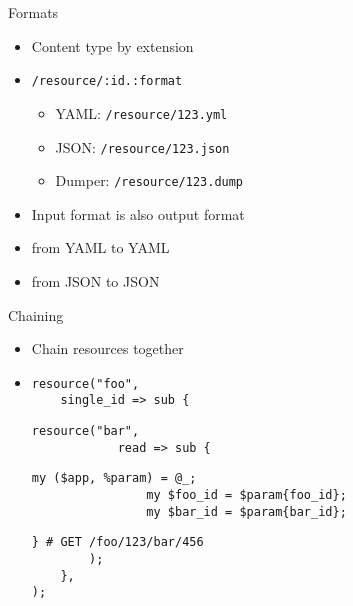 \begin{frame}{Formats}
    \pause
    \begin{itemize}
        \item Content type by extension
        \pause
        \item \texttt{/resource/:id.:format}
        \pause
        \begin{itemize}
            \item YAML: \texttt{/resource/123.yml}
            \pause
            \item JSON: \texttt{/resource/123.json}
            \pause
            \item Dumper: \texttt{/resource/123.dump}
            \pause
        \end{itemize}
        \item Input format is also output format
        \pause
        \item from YAML to YAML
        \pause
        \item from JSON to JSON
    \end{itemize}

\end{frame}


\begin{frame}[fragile]{Chaining}
\pause
\begin{itemize}
\item Chain resources together
\pause
\item[]
\begin{lstlisting}
resource("foo",
    single_id => sub {
\end{lstlisting}\pause\begin{lstlisting}[firstnumber=last]
        resource("bar",
            read => sub {
\end{lstlisting}\pause\begin{lstlisting}[firstnumber=last]
                my ($app, %param) = @_;
                my $foo_id = $param{foo_id};
                my $bar_id = $param{bar_id};
\end{lstlisting}\pause\begin{lstlisting}[firstnumber=last]
            } # GET /foo/123/bar/456
        );
    },
);
\end{lstlisting}
\end{itemize}
\end{frame}

